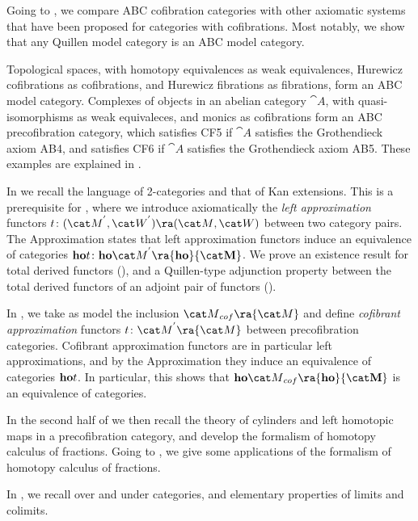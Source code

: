 Going to , we compare ABC cofibration categories with other axiomatic systems that have been proposed for categories with cofibrations. Most notably, we show that any Quillen model category is an ABC model category.

Topological spaces, with homotopy equivalences as weak equivalences, Hurewicz cofibrations as cofibrations, and Hurewicz fibrations as fibrations, form an ABC model category. Complexes of objects in an abelian category ${\cat A}$, with quasi-isomorphisms as weak equivaleces, and monics as cofibrations form an ABC precofibration category, which satisfies CF5 if ${\cat A}$ satisfies the Grothendieck axiom AB4, and satisfies CF6 if ${\cat A}$ satisfies the Grothendieck axiom AB5. These examples are explained in .

In  we recall the language of 2-categories and that of Kan extensions. This is a prerequisite for , where we introduce axiomatically the {\it left approximation} functors $t \colon ({\cat M}^{'}, {\cat W}^{'}) \ra ({\cat M}, {\cat W})$ between two category pairs. The Approximation  states that left approximation functors induce an equivalence of categories ${\bf ho}t \colon {\bf ho}{\cat M}^{'} \ra {\bf ho}{\cat M}$. We prove an existence result for total derived functors (), and a Quillen-type adjunction property between the total derived functors of an adjoint pair of functors (). 

In , we take as model the inclusion ${\cat M}_{cof} \ra {\cat M}$ and define {\it cofibrant approximation} functors $t \colon {\cat M}^{'} \ra {\cat M}$ between precofibration categories. Cofibrant approximation functors are in particular left approximations, and by the Approximation  they induce an equivalence of categories ${\bf ho}t$. In particular, this shows that ${\bf ho}{\cat M}_{cof} \ra {\bf ho}{\cat M}$ is an equivalence of categories.

In the second half of  we then recall the theory of cylinders and left homotopic maps in a precofibration category, and develop the formalism of homotopy calculus of fractions. Going to , we give some applications of the formalism of homotopy calculus of fractions.

In , we recall over and under categories, and elementary properties of limits and colimits.

